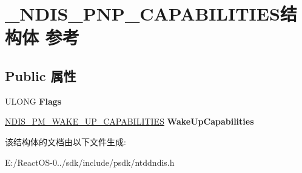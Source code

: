 \hypertarget{struct___n_d_i_s___p_n_p___c_a_p_a_b_i_l_i_t_i_e_s}{}\section{\+\_\+\+N\+D\+I\+S\+\_\+\+P\+N\+P\+\_\+\+C\+A\+P\+A\+B\+I\+L\+I\+T\+I\+E\+S结构体 参考}
\label{struct___n_d_i_s___p_n_p___c_a_p_a_b_i_l_i_t_i_e_s}
\subsection*{Public 属性}
\begin{DoxyCompactItemize}
\item 
\mbox{\label{struct___n_d_i_s___p_n_p___c_a_p_a_b_i_l_i_t_i_e_s_a0e41e8e97d4739123a6d3f4b0fb7a618}} 
U\+L\+O\+NG {\bfseries Flags}
\item 
\mbox{\label{struct___n_d_i_s___p_n_p___c_a_p_a_b_i_l_i_t_i_e_s_ada1665ea3e5b3154b0f2b5dbefc9265b}} 
\hyperlink{struct___n_d_i_s___p_m___w_a_k_e___u_p___c_a_p_a_b_i_l_i_t_i_e_s}{N\+D\+I\+S\+\_\+\+P\+M\+\_\+\+W\+A\+K\+E\+\_\+\+U\+P\+\_\+\+C\+A\+P\+A\+B\+I\+L\+I\+T\+I\+ES} {\bfseries Wake\+Up\+Capabilities}
\end{DoxyCompactItemize}


该结构体的文档由以下文件生成\+:\begin{DoxyCompactItemize}
\item 
E\+:/\+React\+O\+S-\/0../sdk/include/psdk/ntddndis.\+h\end{DoxyCompactItemize}
